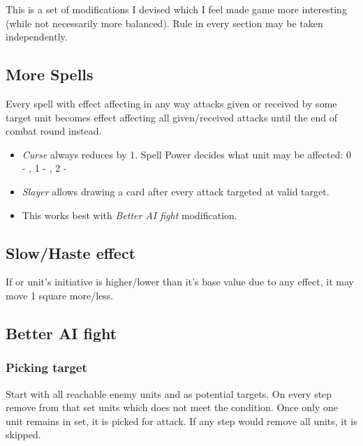 
\begin{multicols*}{2}
    
    This is a set of modifications I devised which I feel made game more interesting (while not necessarily more balanced). Rule in every section may be taken independently.
    
    \subsection*{More  Spells}
    
    Every spell with  effect affecting in any way attacks given or received by some target unit becomes  effect affecting all given/received attacks until the end of combat round instead.
    
    \begin{itemize}
        \item \emph{Curse} always reduces  by 1. Spell Power decides what unit may be affected: 0 - \bronze, 1 - \bronze \silver, 2 - \bronze \silver \golden
        \item \emph{Slayer} allows drawing a card after every attack targeted at valid  target.
        \item This works best with \textit{Better AI fight} modification.
    \end{itemize}
    
    \subsection*{Slow/Haste effect}
    
    If  or  unit's initiative is higher/lower than it's base value due to any effect, it may move 1 square more/less.
    
    \subsection*{Better AI fight}
    
    \subsubsection*{Picking target}
    
    Start with all reachable enemy units and as potential targets. On every step remove from that set units which does not meet the condition. Once only one unit remains in set, it is picked for attack. If any step would remove all units, it is skipped.
    

\end{multicols*}
